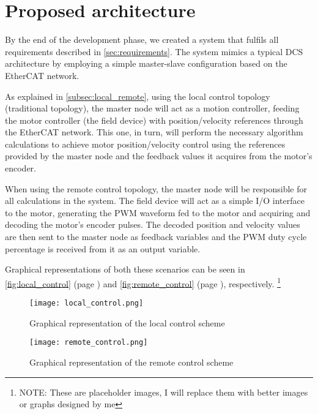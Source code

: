 \section{Proposed architecture} \label{sec:proposed-arch}

By the end of the development phase, we created a system that fulfils all requirements described in \autoref{sec:requirements}.
The system mimics a typical DCS architecture by employing a simple master-slave configuration based on the EtherCAT network.

As explained in \autoref{subsec:local_remote}, using the local control topology (traditional topology), the master node will act as a motion controller, feeding the motor controller (the field device) with position/velocity references through the EtherCAT network.
This one, in turn, will perform the necessary algorithm calculations to achieve motor position/velocity control using the references provided by the master node and the feedback values it acquires from the motor's encoder.

When using the remote control topology, the master node will be responsible for all calculations in the system.
The field device will act as a simple I/O interface to the motor, generating the PWM waveform fed to the motor and acquiring and decoding the motor's encoder pulses.
The decoded position and velocity values are then sent to the master node as feedback variables and the PWM duty cycle percentage is received from it as an output variable.

Graphical representations of both these scenarios can be seen in \autoref{fig:local_control} (page \pageref{fig:local_control}) and \autoref{fig:remote_control} (page \pageref{fig:remote_control}), respectively. \footnote{NOTE: These are placeholder images, I will replace them with better images or graphs designed by me}


\begin{figure}[t]
	\centering
	\texttt{[image: local\_control.png]}
	\caption{Graphical representation of the local control scheme}
	\label{fig:local_control}
\end{figure}

\begin{figure}[t]
	\centering
	\texttt{[image: remote\_control.png]}
	\caption{Graphical representation of the remote control scheme}
	\label{fig:remote_control}
\end{figure}





